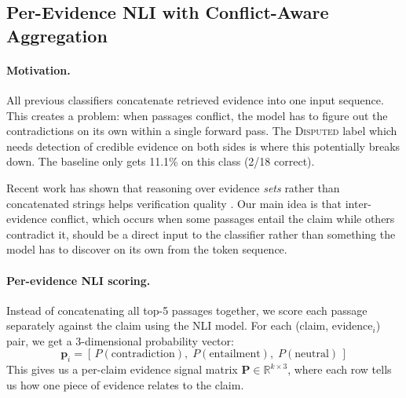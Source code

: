 \documentclass[11pt]{article}
\begin{document}
\subsection{Per-Evidence NLI with Conflict-Aware Aggregation}
\label{sec:conflict}

\paragraph{Motivation.}
All previous classifiers concatenate retrieved evidence into one input
sequence.
This creates a problem: when passages conflict, the model has to figure
out the contradictions on its own within a single forward pass.
The \textsc{Disputed} label which needs detection of credible
evidence on both sides is where this potentially breaks down.
The baseline only gets 11.1\% on this class (2/18 correct).

Recent work has shown that reasoning over evidence \emph{sets} rather
than concatenated strings helps verification quality
\citep{shang-etal-2024-rafts, kapadia-etal-2025-minimal}.
Our main idea is that inter-evidence conflict, which occurs when some
passages entail the claim while others contradict it, should be a
direct input to the classifier rather than something the model has to
discover on its own from the token sequence.

\paragraph{Per-evidence NLI scoring.}
Instead of concatenating all top-5 passages together, we score each
passage separately against the claim using the NLI model.
For each (claim, evidence$_i$) pair, we get a 3-dimensional probability
vector:
\begin{equation}
  \mathbf{p}_i = [\,P(\text{contradiction}),\; P(\text{entailment}),\;
  P(\text{neutral})\,]
\end{equation}
This gives us a per-claim evidence signal matrix
$\mathbf{P} \in \mathbb{R}^{k \times 3}$, where each row tells us
how one piece of evidence relates to the claim.
\end{document}
